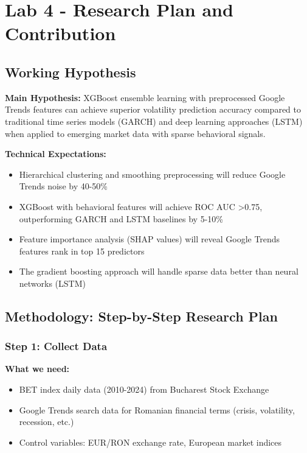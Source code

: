 \documentclass[12pt,a4paper]{article}
\begin{document}
\newpage
\section{Lab 4 - Research Plan and Contribution}

\subsection{Working Hypothesis}

\textbf{Main Hypothesis:} XGBoost ensemble learning with preprocessed Google Trends features can achieve superior volatility prediction accuracy compared to traditional time series models (GARCH) and deep learning approaches (LSTM) when applied to emerging market data with sparse behavioral signals.

\textbf{Technical Expectations:}
\begin{itemize}
    \item Hierarchical clustering and smoothing preprocessing will reduce Google Trends noise by 40-50\%
    \item XGBoost with behavioral features will achieve ROC AUC >0.75, outperforming GARCH and LSTM baselines by 5-10\%
    \item Feature importance analysis (SHAP values) will reveal Google Trends features rank in top 15 predictors
    \item The gradient boosting approach will handle sparse data better than neural networks (LSTM)
\end{itemize}

\subsection{Methodology: Step-by-Step Research Plan}

\subsubsection{Step 1: Collect Data}

\textbf{What we need:}
\begin{itemize}
    \item BET index daily data (2010-2024) from Bucharest Stock Exchange
    \item Google Trends search data for Romanian financial terms (crisis, volatility, recession, etc.)
    \item Control variables: EUR/RON exchange rate, European market indices
\end{itemize}
\end{document}
